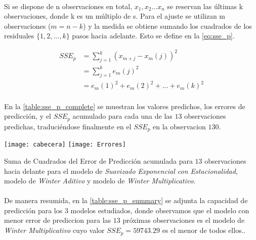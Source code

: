 \documentclass[a4paper, spanish]{article}
\begin{document}
    \paragraph{}
    Si se dispone de n observaciones en total, $x_1,x_2...x_n$ se reservan las últimas k observaciones, donde k es un múltiplo de s. Para el ajuste se utilizan m observaciones ($m = n - k$) y la medida se obtiene sumando los cuadrados de los residuales $\{1, 2, ..., k\}$ pasos hacia adelante. Esto se define en la \autoref{eq:sse_p}.

    \begin{equation}
    \label{eq:sse_p}
      \begin{split}
        SSE_p
        &= \sum_{j = 1} ^ k (x_{m + j} - x_{m}(j)) ^ 2 \\
        &= \sum_{j = 1} ^ k e_m(j) ^ 2 \\
        &= e_m(1) ^ 2 + e_m(2) ^ 2 + ... + e_m(k) ^ 2
      \end{split}
    \end{equation}

    \paragraph{}
    En la \autoref{table:sse_p_complete} se muestran los valores predichos, los errores de predicción, y el $SSE_p$ acumulado para cada una de las $13$ observaciones predichas, traduciéndose finalmente en el $SSE_p$ en la observacion $130$.

    \begin{table}[htb!]
      \centering
      \texttt{[image: cabecera]}
      \texttt{[image: Errores]}
      \caption{Suma de Cuadrados del Error de Predicción acumulada para $13$ observaciones hacia delante para el modelo de \emph{Suavizado Exponencial con Estacionalidad}, modelo de \emph{Winter Aditivo} y modelo de \emph{Winter Multiplicativo}.}
      \label{table:sse_p_complete}
    \end{table}

    \paragraph{}
    De manera resumida, en la \autoref{table:sse_p_summary} se adjunta la capacidad de predicción para los $3$ modelos estudiados, donde observamos que el modelo con menor error de prediccion para las $13$ próximas observaciones es el modelo de \emph{Winter Multiplicativo} cuyo valor $SSE_p = 59743.29$ es el menor de todos ellos..
\end{document}
